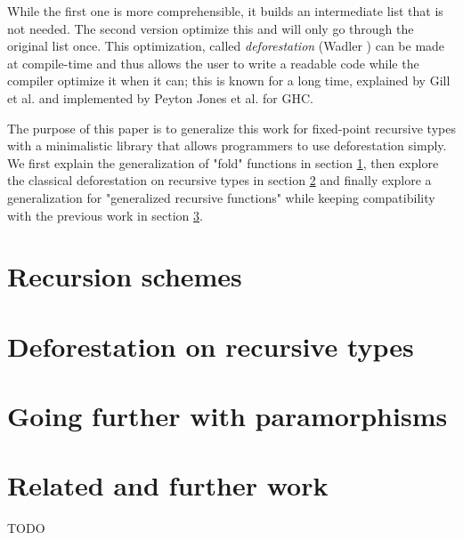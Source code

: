 \documentclass[format=sigplan]{acmart}
\begin{document}
\noindent While the first one is more comprehensible, it builds an intermediate list that is not needed. The second version optimize this and will only go through the original list once.
This optimization, called \emph{deforestation} (Wadler \cite{WADLER1990231}) can be made at compile-time and thus allows the user to write a readable code while the compiler optimize it when it can; this is known for a long time, explained by Gill et al. \cite{Gill:1993:SCD:165180.165214} and implemented by Peyton Jones et al. \cite{pbr} for GHC.

The purpose of this paper is to generalize this work for fixed-point recursive types with a minimalistic library that allows programmers to use deforestation simply. We first explain the generalization of "fold" functions in section \ref{sec:recschemes}, then explore the classical deforestation on recursive types in section \ref{sec:rectypes} and finally explore a generalization for "generalized recursive functions" while keeping compatibility with the previous work in section \ref{sec:para}.

\section{Recursion schemes}
\label{sec:recschemes}


\section{Deforestation on recursive types}
\label{sec:rectypes}


\section{Going further with paramorphisms}
\label{sec:para}


\section{Related and further work}
\label{sec:related}


\begin{acks}
TODO
\end{acks}




\end{document}
